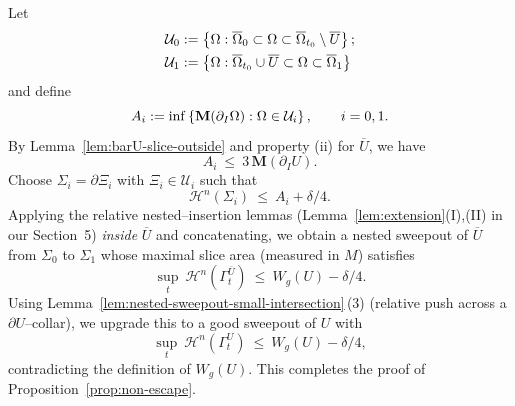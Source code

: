 Let 
\begin{equation*}
    \begin{split}
        &\mathcal{U}_0:=\left\{\Omega: \overline{\Omega}_0\subset \Omega\subset \overline{\Omega}_{t_0}\setminus \overline{U}\right\};\\
        &\mathcal{U}_1:=\left\{\Omega: \overline{\Omega}_{t_0}\cup \overline{U}\subset \Omega\subset \overline{\Omega}_1\right\}
    \end{split}
\end{equation*}
and define
\begin{equation*}
  A_i:=\inf\left\{\mathbf{M}(\partial_I\Omega) : \Omega\in\mathcal{U}_i\right\},\qquad i=0,1.
\end{equation*}
By Lemma~\ref{lem:barU-slice-outside} and property (ii) for $\overline U$, we have 
\begin{equation*}
  A_i\ \le\ 3\,\mathbf{M}(\partial_IU).
\end{equation*}
Choose $\Sigma_i=\partial\Xi_i$ with $\Xi_i\in\mathcal U_i$ such that 
\begin{equation*}
  \mathcal{H}^n(\Sigma_i)\ \le\ A_i+\delta/4.
\end{equation*}
Applying the relative nested–insertion lemmas (Lemma~\ref{lem:extension}(I),(II) in our Section~5) \emph{inside} $\overline U$ and concatenating,
we obtain a nested sweepout of $\overline U$ from $\Sigma_0$ to $\Sigma_1$ whose maximal slice area (measured in $M$) satisfies
\begin{equation*}
  \sup_{t}\ \mathcal{H}^n(\Gamma^{\overline U}_t)\ \le\ W_g(U)-\delta/4.
\end{equation*}
Using Lemma~\ref{lem:nested-sweepout-small-intersection}\,(3) (relative push across a $\partial U$–collar),
we upgrade this to a good sweepout of $U$ with
\begin{equation*}
  \sup_{t}\ \mathcal{H}^n(\Gamma^{U}_t)\ \le\ W_g(U)-\delta/4,
\end{equation*}
contradicting the definition of $W_g(U)$. This completes the proof of Proposition~\ref{prop:non-escape}.

